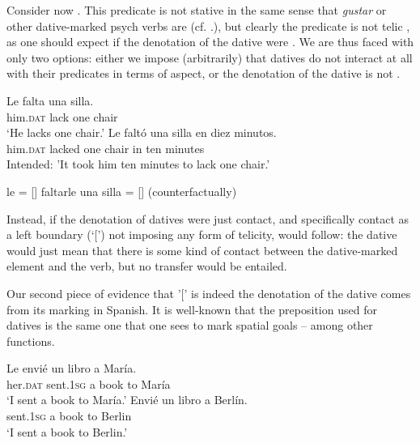 \documentclass[output=paper,colorlinks,citecolor=brown,nonflat]{langsci/langscibook}
\begin{document}
Consider now . This predicate is not stative in the same sense that \textit{gustar} or other dative-marked psych verbs are (cf. .), but clearly the predicate is not telic , as one should expect if the denotation of the dative  were . We are thus faced with only two options: either we impose (arbitrarily) that datives do not interact at all with their predicates in terms of aspect, or the denotation of the dative is not .

\ea%
    \label{ex:fabregas:19}
    \ea\label{ex:fabregas:19a}
    \gll    Le       falta   una silla.\\
            {him.}\textsc{dat}  {lack}  {one} {chair}\\
    \glt `He lacks one chair.' 
    \ex\label{ex:fabregas:19b}
    \gll    *Le           faltó     una silla  en diez minutos.\\
            him.\textsc{dat}    lacked  one chair in  ten  minutes\\
    \glt    Intended: 'It took him ten minutes to lack one chair.'
    \z
\z

\ea%
    \label{ex:fabregas:20}
    \ea\label{ex:fabregas:20a}
    le              =     [{\midline}]
    \ex\label{ex:fabregas:20b}
    faltarle una silla    =    [{\midline}] (counterfactually)
    \z
\z

Instead, if the denotation of datives were just contact, and specifically contact as a left boundary (‘[') not imposing any form of telicity,  would follow: the dative would just mean that there is some kind of contact between the dative-marked element and the verb, but no transfer would be entailed. 

Our second piece of evidence that '[' is indeed the denotation of the dative comes from its marking in Spanish. It is well-known that the preposition used for datives  is the same one that one sees to mark spatial goals  – among other functions.

\ea%
    \label{ex:fabregas:21}
    \ea\label{ex:fabregas:21a}
    \gll    Le     envié     un libro  a  María.\\
            {her.}\textsc{dat}  {sent.1}\textsc{sg}     {a}   {book} {to} {María}\\
    \glt `I sent a book to María.'
    \ex\label{ex:fabregas:21b}
    \gll    Envié     un libro a  Berlín.\\
            {sent.1}\textsc{sg}    {a}  {book} {to} {Berlin}\\
    \glt `I sent a book to Berlin.'
    \z
\z
\end{document}
